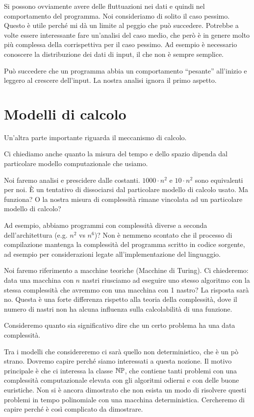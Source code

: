 Si possono ovviamente avere delle fluttuazioni nei dati e quindi nel comportamento del programma.
Noi consideriamo di solito il caso pessimo. Questo è utile perché mi dà un limite al peggio che
può succedere. Potrebbe a volte essere interessante fare un'analisi del caso medio, che però è in
genere molto più complessa della corrispettiva per il caso pessimo. Ad esempio è necessario
conoscere la distribuzione dei dati di input, il che non è sempre semplice.

Può succedere che un programma abbia un comportamento ``pesante'' all'inizio e leggero al crescere
dell'input. La nostra analisi ignora il primo aspetto.

\section{Modelli di calcolo}

Un'altra parte importante riguarda il meccanismo di calcolo.

Ci chiediamo anche quanto la misura del tempo e dello spazio dipenda dal particolare modello
computazionale che usiamo.

Noi faremo analisi e prescidere dalle costanti. $1000\cdot n^{2}$ e $10\cdot n^{2}$ sono equivalenti per noi.
È un tentativo di dissociarsi dal particolare modello di calcolo usato. Ma funziona? O la nostra
misura di complessità rimane vincolata ad un particolare modello di calcolo?

Ad esempio, abbiamo programmi con complessità diverse a seconda dell'architettura (e.g. $n^{2}$ vs
$n^{6}$)? Non è nemmeno scontato che il processo di compilazione mantenga la complessità del
programma scritto in codice sorgente, ad esempio per considerazioni legate all'implementazione del
linguaggio.

Noi faremo riferimento a macchine teoriche (Macchine di Turing). Ci chiederemo: data una macchina
con $n$ nastri riusciamo ad eseguire uno stesso algoritmo con la stessa complessità che avremmo con
una macchina con 1 nastro? La risposta sarà no. Questa è una forte differenza rispetto alla teoria
della complessità, dove il numero di nastri non ha alcuna influenza sulla calcolabilità di una
funzione.

Consideremo quanto sia significativo dire che un certo problema ha una data complessità.

Tra i modelli che considereremo ci sarà quello non deterministico, che è un pò strano. Dovremo
capire perché siamo interessati a questa nozione. Il motivo principale è che ci interessa la classe
$\mathbb{NP}$, che contiene tanti problemi con una complessità computazionale elevata con gli algoritmi
odierni e con delle buone euristiche. Non si è ancora dimostrato che non esista un modo di risolvere
questi problemi in tempo polinomiale con una macchina deterministica. Cercheremo di capire perché è
così complicato da dimostrare.

